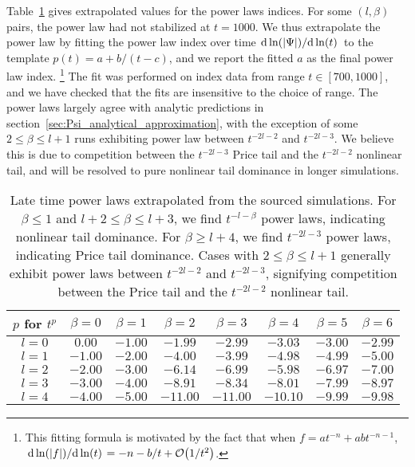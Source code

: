 \documentclass[reprint,aps,physrev,superscriptaddress,10pt,notitlepage,prd,nofootinbib,onecolumn]{revtex4-2}
\newcommand{\Tref}[1]{Table~\ref{#1}}
\newcommand{\sref}[1]{section~\ref{#1}}
\begin{document}
\Tref{tab:nonlinear_tail_power_laws} gives extrapolated values for the power laws indices.
For some $(l,\beta)$ pairs, the power law had not stabilized at $t=1000$.
We thus extrapolate the power law by fitting the power law index over time $\dv*{\ln(|\Psi|)}{\ln(t)}$ to the template $p(t) = a + b / (t - c)$, and we report the fitted $a$ as the final power law index.
\footnote{This fitting formula is motivated by the fact that when $f = a t^{-n} + ab t^{-n-1}$, $\dv*{\ln(|f|)}{\ln(t)} = -n - b / t + \order{1/t^2}$.}
The fit was performed on index data from range $t \in [700,1000]$, and we have checked that the fits are insensitive to the choice of range.
The power laws largely agree with analytic predictions in \sref{sec:Psi_analytical_approximation}, with the exception of some $2 \leq \beta \leq l+1$ runs exhibiting power law between $t^{-2l-2}$ and $t^{-2l-3}$.
We believe this is due to competition between the $t^{-2l-3}$ Price tail and the $t^{-2l-2}$ nonlinear tail, and will be resolved to pure nonlinear tail dominance in longer simulations.
\begin{table}[t]
  \centering
  \begin{tabular}{|c|c|c|c|c|c|c|c|}
    \hline
    $p$ for $t^{p}$ & $\beta=0$ & $\beta=1$ & $\beta=2$ & $\beta=3$ & $\beta=4$ & $\beta=5$ & $\beta=6$ \\
    \hline
    $l=0$&$0.00$&$-1.00$&$-1.99$&$-2.99$&$-3.03$&$-3.00$&$-2.99$\\$l=1$&$-1.00$&$-2.00$&$-4.00$&$-3.99$&$-4.98$&$-4.99$&$-5.00$\\$l=2$&$-2.00$&$-3.00$&$-6.14$&$-6.99$&$-5.98$&$-6.97$&$-7.00$\\$l=3$&$-3.00$&$-4.00$&$-8.91$&$-8.34$&$-8.01$&$-7.99$&$-8.97$\\$l=4$&$-4.00$&$-5.00$&$-11.00$&$-11.00$&$-10.10$&$-9.99$&$-9.98$ \\
    \hline
  \end{tabular}
  \caption{Late time power laws extrapolated from the sourced simulations.
    For $\beta \leq 1$ and $l + 2 \leq \beta \leq l+3$, we find $t^{-l-\beta}$ power laws, indicating nonlinear tail dominance.
    For $\beta \geq l+4$, we find $t^{-2l-3}$ power laws, indicating Price tail dominance.
    Cases with $2 \leq \beta \leq l+1$ generally exhibit power laws between $t^{-2l-2}$ and $t^{-2l-3}$, signifying competition between the Price tail and the $t^{-2l-2}$ nonlinear tail.
  }
  \label{tab:nonlinear_tail_power_laws}
\end{table}
\end{document}
